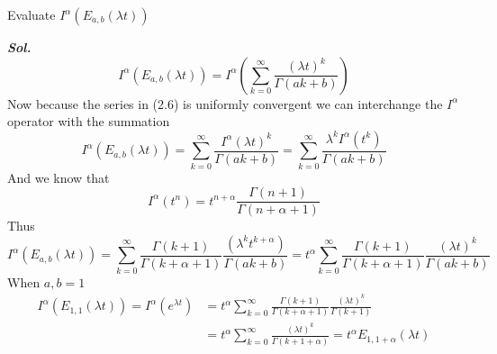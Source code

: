 \begin{example}
    Evaluate $I^\alpha (E_{a,b}(\lambda t))$

    \textit{ \textbf{Sol.} }
    \begin{equation}
        I^\alpha (E_{a,b}(\lambda t)) = I^\alpha \left(\sum_{k=0}^{\infty}\frac{{(\lambda t)}^k}{\Gamma(a k + b )}\right)
    \end{equation}
    Now because the series in (2.6) is uniformly convergent we can interchange the $I^\alpha$ operator with the summation
    \[
        I^\alpha (E_{a,b}(\lambda t)) = \sum_{k=0}^{\infty}\frac{I^\alpha (\lambda t)^k}{\Gamma(a k + b )} = \sum_{k=0}^{\infty}\frac{\lambda^k I^\alpha (t^k)}{\Gamma(a k + b )}
    \]
    And we know that 
    \[
        I^\alpha (t^n) = t^{n+\alpha}\frac{\Gamma{(n+1)} } {\Gamma{(n+\alpha+1)} }    
    \]
    Thus 
    \[
        I^\alpha (E_{a,b}(\lambda t)) = \sum_{k=0}^{\infty}\frac{\Gamma{(k+1)} } {\Gamma{(k+\alpha+1)} } \frac{(\lambda^k t^{k+\alpha})}{\Gamma(a k + b )} = t^{\alpha} \sum_{k=0}^{\infty}\frac{\Gamma{(k+1)} } {\Gamma{(k+\alpha+1)} } \frac{{(\lambda t)}^k}{\Gamma(a k + b )}
    \]
    When $a,b = 1$ 
    \begin{align*}
        I^\alpha (E_{1,1}(\lambda t)) = I^\alpha (e^{\lambda t}) &= t^{\alpha} \sum_{k=0}^{\infty}\frac{\Gamma{(k+1)} } {\Gamma{(k+\alpha+1)} } \frac{(\lambda t)^{k}}{\Gamma(k + 1 )}
        \\
        & = t^{\alpha} \sum_{k=0}^{\infty} \frac{(\lambda t)^{k}}{\Gamma(k+1+\alpha)} = t^{\alpha} E_{1,1+\alpha}(\lambda t)
    \end{align*}
\end{example}

